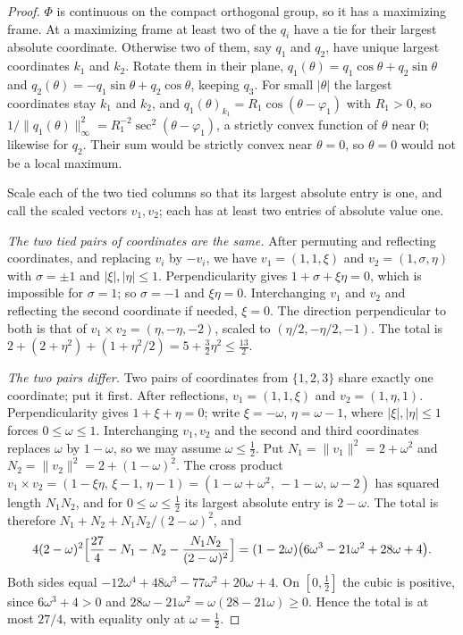 \documentclass[11pt]{amsart}
\theoremstyle{remark}
\numberwithin{equation}{section}
\begin{document}
\begin{proof}
$\Phi$ is continuous on the compact orthogonal group, so it has a maximizing frame. At a maximizing frame at least two of the $q_i$ have a tie for their largest absolute coordinate. Otherwise two of them, say $q_1$ and $q_2$, have unique largest coordinates $k_1$ and $k_2$. Rotate them in their plane, $q_1(\theta)=q_1\cos\theta+q_2\sin\theta$ and $q_2(\theta)=-q_1\sin\theta+q_2\cos\theta$, keeping $q_3$. For small $|\theta|$ the largest coordinates stay $k_1$ and $k_2$, and $q_1(\theta)_{k_1}=R_1\cos(\theta-\varphi_1)$ with $R_1>0$, so $1/\|q_1(\theta)\|_\infty^2=R_1^{-2}\sec^2(\theta-\varphi_1)$, a strictly convex function of $\theta$ near $0$; likewise for $q_2$. Their sum would be strictly convex near $\theta=0$, so $\theta=0$ would not be a local maximum.

Scale each of the two tied columns so that its largest absolute entry is one, and call the scaled vectors $v_1,v_2$; each has at least two entries of absolute value one.

\emph{The two tied pairs of coordinates are the same.} After permuting and reflecting coordinates, and replacing $v_i$ by $-v_i$, we have $v_1=(1,1,\xi)$ and $v_2=(1,\sigma,\eta)$ with $\sigma=\pm1$ and $|\xi|,|\eta|\le1$. Perpendicularity gives $1+\sigma+\xi\eta=0$, which is impossible for $\sigma=1$; so $\sigma=-1$ and $\xi\eta=0$. Interchanging $v_1$ and $v_2$ and reflecting the second coordinate if needed, $\xi=0$. The direction perpendicular to both is that of $v_1\times v_2=(\eta,-\eta,-2)$, scaled to $(\eta/2,-\eta/2,-1)$. The total is $2+(2+\eta^2)+(1+\eta^2/2)=5+\frac32\eta^2\le\frac{13}2$.

\emph{The two pairs differ.} Two pairs of coordinates from $\{1,2,3\}$ share exactly one coordinate; put it first. After reflections, $v_1=(1,1,\xi)$ and $v_2=(1,\eta,1)$. Perpendicularity gives $1+\xi+\eta=0$; write $\xi=-\omega$, $\eta=\omega-1$, where $|\xi|,|\eta|\le1$ forces $0\le\omega\le1$. Interchanging $v_1,v_2$ and the second and third coordinates replaces $\omega$ by $1-\omega$, so we may assume $\omega\le\frac12$. Put $N_1=\|v_1\|^2=2+\omega^2$ and $N_2=\|v_2\|^2=2+(1-\omega)^2$. The cross product $v_1\times v_2=(1-\xi\eta,\,\xi-1,\,\eta-1)=(1-\omega+\omega^2,\,-1-\omega,\,\omega-2)$ has squared length $N_1N_2$, and for $0\le\omega\le\frac12$ its largest absolute entry is $2-\omega$. The total is therefore $N_1+N_2+N_1N_2/(2-\omega)^2$, and
\begin{equation}\label{eq:identity}
4(2-\omega)^2\Bigl[\frac{27}4-N_1-N_2-\frac{N_1N_2}{(2-\omega)^2}\Bigr]=(1-2\omega)\bigl(6\omega^3-21\omega^2+28\omega+4\bigr).
\end{equation}
Both sides equal $-12\omega^4+48\omega^3-77\omega^2+20\omega+4$. On $[0,\frac12]$ the cubic is positive, since $6\omega^3+4>0$ and $28\omega-21\omega^2=\omega(28-21\omega)\ge0$. Hence the total is at most $27/4$, with equality only at $\omega=\frac12$.
\end{proof}
\end{document}

